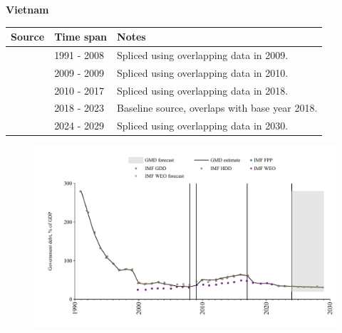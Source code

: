 \documentclass[12pt,a4paper,landscape]{article}
\begin{document}
\begin{adjustbox}{max totalsize={\paperwidth}{\paperheight},center}
\begin{minipage}[t][\textheight][t]{\textwidth}
\vspace*{0.5cm}
{}
\begin{center}
{\Large\bfseries Vietnam}
\end{center}
\vspace{0.5cm}
\begin{table}[H]
\centering
\small
\begin{tabular}{|l|l|l|}
\hline
\textbf{Source} & \textbf{Time span} & \textbf{Notes} \\
\hline
\rowcolor{white}\cite{IMF_GDD}& 1991 - 2008 &Spliced using overlapping data in 2009.\\
\rowcolor{lightgray}\cite{IMF_FPP}& 2009 - 2009 &Spliced using overlapping data in 2010.\\
\rowcolor{white}\cite{IMF_GDD}& 2010 - 2017 &Spliced using overlapping data in 2018.\\
\rowcolor{lightgray}\cite{IMF_FPP}& 2018 - 2023 &Baseline source, overlaps with base year 2018.\\
\rowcolor{white}\cite{IMF_WEO_forecast}& 2024 - 2029 &Spliced using overlapping data in 2030.\\
\hline
\end{tabular}
\end{table}
\begin{figure}[H]
\centering
\includegraphics[width=\textwidth,height=0.6\textheight,keepaspectratio]{graphs/VNM_govdebt_GDP.pdf}
\end{figure}
\end{minipage}
\end{adjustbox}
\end{document}
